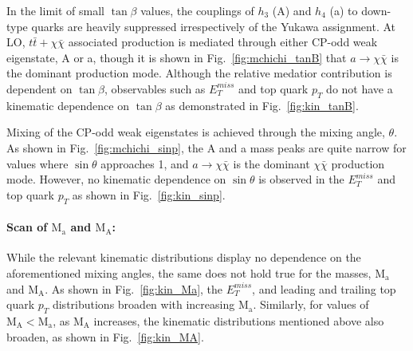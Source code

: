 In the limit of small $\tan\beta$ values, the couplings of $h_{3}$ (A) and $h_{4}$ (a) to down-type quarks are heavily suppressed irrespectively of the Yukawa assignment. At LO, $t\bar{t}+\chi\bar{\chi}$ associated production is mediated through either CP-odd weak eigenstate, A or a, though it is shown in Fig.~\ref{fig:mchichi_tanB} that $a\rightarrow\chi\bar{\chi}$ is the dominant production mode. Although the relative medatior contribution is dependent on $\tan\beta$, observables such as $E_{T}^{miss}$ and top quark $p_{T}$ do not have a kinematic dependence on $\tan\beta$ as demonstrated in Fig.~\ref{fig:kin_tanB}.

Mixing of the CP-odd weak eigenstates is achieved through the mixing angle, $\theta$. As shown in Fig.~\ref{fig:mchichi_sinp}, the A and a mass peaks are quite narrow for values where $\sin\theta$ approaches 1, and $a\rightarrow\chi\bar{\chi}$ is the dominant $\chi\bar{\chi}$ production mode. However, no kinematic dependence on $\sin\theta$ is observed in the $E_{T}^{miss}$ and top quark $p_{T}$ as shown in Fig.~\ref{fig:kin_sinp}.

\paragraph{Scan of $\mathrm{M_{a}}$ and $\mathrm{M_{A}}$:}

While the relevant kinematic distributions display no dependence on the aforementioned mixing angles, the same does not hold true for the masses, $\mathrm{M_{a}}$ and $\mathrm{M_{A}}$. As shown in Fig.~\ref{fig:kin_Ma}, the $E_{T}^{miss}$, and leading and trailing top quark $p_{T}$ distributions broaden with increasing $\mathrm{M_{a}}$. Similarly, for values of $\mathrm{M_{A}} < \mathrm{M_{a}}$, as $\mathrm{M_{A}}$ increases, the kinematic distributions mentioned above also broaden, as shown in Fig.~\ref{fig:kin_MA}.

